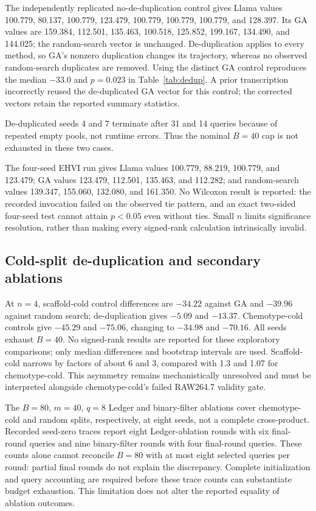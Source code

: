 The independently replicated no-de-duplication control gives Llama values 100.779, 80.137, 100.779, 123.479, 100.779, 100.779, 100.779, and 128.397. Its GA values are 159.384, 112.501, 135.463, 100.518, 125.852, 199.167, 134.490, and 144.025; the random-search vector is unchanged. De-duplication applies to every method, so GA's nonzero duplication changes its trajectory, whereas no observed random-search duplicates are removed. Using the distinct GA control reproduces the median $-33.0$ and $p=0.023$ in Table~\ref{tab:dedup}. A prior transcription incorrectly reused the de-duplicated GA vector for this control; the corrected vectors retain the reported summary statistics.

De-duplicated seeds 4 and 7 terminate after 31 and 14 queries because of repeated empty pools, not runtime errors. Thus the nominal $B=40$ cap is not exhausted in these two cases.

The four-seed EHVI run gives Llama values 100.779, 88.219, 100.779, and 123.479; GA values 123.479, 112.501, 135.463, and 112.282; and random-search values 139.347, 155.060, 132.080, and 161.350. No Wilcoxon result is reported: the recorded invocation failed on the observed tie pattern, and an exact two-sided four-seed test cannot attain $p<0.05$ even without ties. Small $n$ limits significance resolution, rather than making every signed-rank calculation intrinsically invalid.

\subsection{Cold-split de-duplication and secondary ablations}
\label{app:dedup-other-splits}
At $n=4$, scaffold-cold control differences are $-34.22$ against GA and $-39.96$ against random search; de-duplication gives $-5.09$ and $-13.37$. Chemotype-cold controls give $-45.29$ and $-75.06$, changing to $-34.98$ and $-70.16$. All seeds exhaust $B=40$. No signed-rank results are reported for these exploratory comparisons; only median differences and bootstrap intervals are used. Scaffold-cold narrows by factors of about 6 and 3, compared with 1.3 and 1.07 for chemotype-cold. This asymmetry remains mechanistically unresolved and must be interpreted alongside chemotype-cold's failed RAW264.7 validity gate.

The $B=80$, $m=40$, $q=8$ Ledger and binary-filter ablations cover chemotype-cold and random splits, respectively, at eight seeds, not a complete cross-product. Recorded seed-zero traces report eight Ledger-ablation rounds with six final-round queries and nine binary-filter rounds with four final-round queries. These counts alone cannot reconcile $B=80$ with at most eight selected queries per round: partial final rounds do not explain the discrepancy. Complete initialization and query accounting are required before these trace counts can substantiate budget exhaustion. This limitation does not alter the reported equality of ablation outcomes.

